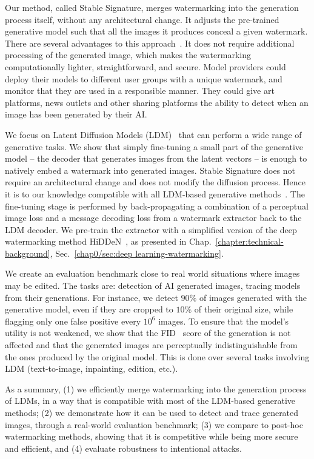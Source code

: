 Our method, called Stable Signature, merges watermarking into the generation process itself, without any architectural change.
It adjusts the pre-trained generative model such that all the images it produces conceal a given watermark.
There are several advantages to this approach~\citep{lin2022cycleganwm, yu2022responsible}.
It does not require additional processing of the generated image, which makes the watermarking computationally lighter, straightforward, and secure.
Model providers could deploy their models to different user groups with a unique watermark, and monitor that they are used in a responsible manner.
They could give art platforms, news outlets and other sharing platforms %
the ability to detect when an image has been generated by their AI.

We focus on Latent Diffusion Models (LDM)~\citep{rombach2022high} that can perform a wide range of generative tasks.
We show that simply fine-tuning a small part of the generative model -- the decoder that generates images from the latent vectors -- is enough to natively embed a watermark into generated images.
Stable Signature does not require an architectural change and does not modify the diffusion process. 
Hence it is to our knowledge compatible with all LDM-based generative methods~\citep{brooks2022instructpix2pix, couairon2022diffedit, peebles2022dit, ruiz2022dreambooth, zhang2023adding}.
The fine-tuning stage is performed by back-propagating a combination of a perceptual image loss and a message decoding loss from a watermark extractor back to the LDM decoder.
We pre-train the extractor with a simplified version of the deep watermarking method HiDDeN~\citep{zhu2018hidden}, as presented in Chap.~\ref{chapter:technical-background}, Sec.~\ref{chap0/sec:deep learning-watermarking}.

We create an evaluation benchmark close to real world situations where images may be edited.
The tasks are: detection of AI generated images, tracing models from their generations.
For instance, we detect $90\%$ of images generated with the generative model, even if they are cropped to $10\%$ of their original size, while flagging only one false positive every $10^6$ images. 
To ensure that the model's utility is not weakened, we show that the FID~\citep{heusel2017gans} score of the generation is not affected and that the generated images are perceptually indistinguishable from the ones produced by the original model. 
This is done over several tasks involving LDM (text-to-image, inpainting, edition, etc.).


As a summary, 
(1) we efficiently merge watermarking into the generation process of LDMs, in a way that is compatible with most of the LDM-based generative methods;
(2) we demonstrate how it can be used to detect and trace generated images, through a real-world evaluation benchmark;
(3) we compare to post-hoc watermarking methods, showing that it is competitive while being more secure and efficient, and (4) evaluate robustness to intentional attacks.
